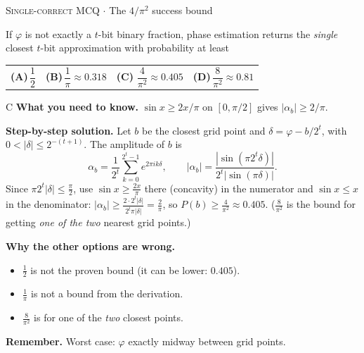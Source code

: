\documentclass[11pt,a4paper]{article}
\newcommand{\optlabel}[1]{\textbf{(#1)}}
\newcommand{\correctlabel}[1]{\textcolor{okgreen}{\textbf{(#1)}\,\ding{51}}}
\newenvironment{qitem}[1]{\begin{list}{}{\setlength{\leftmargin}{3.3em}\setlength{\labelwidth}{3.1em}%
  \setlength{\labelsep}{0.2em}\setlength{\topsep}{3pt}\setlength{\parsep}{3pt}}\item[\textbf{Q.#1}\hfill]}{\end{list}}
\newcommand{\qsep}{\par\vspace{2pt}{\color{black!15}\hrule}\vspace{4pt}}
\newcommand{\qmeta}[2]{{\footnotesize\color{black!60}\textsc{#1} \;$\cdot$\; #2}\par}
\begin{document}
\begin{qitem}{66}
\qmeta{Single-correct MCQ}{The $4/\pi^2$ success bound}
If $\varphi$ is not exactly a $t$-bit binary fraction, phase estimation returns the \emph{single} closest $t$-bit
approximation with probability at least
\par\smallskip\noindent\begin{tabularx}{\linewidth}{@{}*{4}{L}@{}}
\optlabel{A}\,$\dfrac12$ & \optlabel{B}\,$\dfrac1\pi \approx 0.318$ & \correctlabel{C}\,$\dfrac{4}{\pi^2} \approx 0.405$ & \optlabel{D}\,$\dfrac{8}{\pi^2} \approx 0.81$
\end{tabularx}
\end{qitem}
\begin{solbox}{C}
\textbf{\color{brand}What you need to know.} $\sin x \ge 2x/\pi$ on $[0,\pi/2]$ gives $|\alpha_b| \ge 2/\pi$.

\textbf{\color{brand}Step-by-step solution.} Let $b$ be the closest grid point and $\delta = \varphi - b/2^t$, with $0 < |\delta| \le 2^{-(t+1)}$. The amplitude of $b$ is
\[ \alpha_b = \frac{1}{2^t}\sum_{k=0}^{2^t-1}e^{2\pi i k\delta}, \qquad |\alpha_b| = \frac{|\sin(\pi 2^t\delta)|}{2^t|\sin(\pi\delta)|}. \]
Since $\pi2^t|\delta| \le \frac\pi2$, use $\sin x \ge \frac{2x}{\pi}$ there (concavity) in the numerator and $\sin x \le x$ in the
denominator: $|\alpha_b| \ge \frac{2\cdot2^t|\delta|}{2^t\pi|\delta|} = \frac{2}{\pi}$, so $P(b) \ge \frac{4}{\pi^2} \approx 0.405$.
($\frac{8}{\pi^2}$ is the bound for getting \emph{one of the two} nearest grid points.)

\textbf{\color{brand}Why the other options are wrong.}
\begin{itemize}[leftmargin=2.4em, itemsep=1pt, topsep=2pt]
\item[\textbf{(A)}] $\frac12$ is not the proven bound (it can be lower: $0.405$).
\item[\textbf{(B)}] $\frac1\pi$ is not a bound from the derivation.
\item[\textbf{(D)}] $\frac{8}{\pi^2}$ is for one of the \emph{two} closest points.
\end{itemize}
\textbf{\color{brand}Remember.} Worst case: $\varphi$ exactly midway between grid points.
\end{solbox}
\qsep
\end{document}

